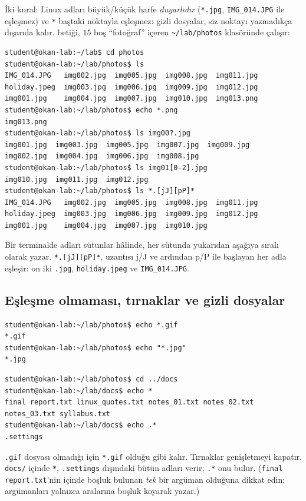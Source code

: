 İki kural: Linux adları büyük/küçük harfe \emph{duyarlıdır} (\texttt{*.jpg}, \texttt{IMG\_014.JPG} ile eşleşmez) ve \texttt{*} baştaki noktayla eşleşmez: gizli dosyalar, siz noktayı yazmadıkça dışarıda kalır.  betiği, $15$ boş ``fotoğraf'' içeren \texttt{\textasciitilde/lab/photos} klasöründe çalışır:

\begin{lstlisting}[style=term]
student@okan-lab:~/lab$ cd photos
student@okan-lab:~/lab/photos$ ls
IMG_014.JPG   img002.jpg  img005.jpg  img008.jpg  img011.jpg
holiday.jpeg  img003.jpg  img006.jpg  img009.jpg  img012.jpg
img001.jpg    img004.jpg  img007.jpg  img010.jpg  img013.png
student@okan-lab:~/lab/photos$ echo *.png
img013.png
student@okan-lab:~/lab/photos$ ls img00?.jpg
img001.jpg  img003.jpg  img005.jpg  img007.jpg  img009.jpg
img002.jpg  img004.jpg  img006.jpg  img008.jpg
student@okan-lab:~/lab/photos$ ls img01[0-2].jpg
img010.jpg  img011.jpg  img012.jpg
student@okan-lab:~/lab/photos$ ls *.[jJ][pP]*
IMG_014.JPG   img002.jpg  img005.jpg  img008.jpg  img011.jpg
holiday.jpeg  img003.jpg  img006.jpg  img009.jpg  img012.jpg
img001.jpg    img004.jpg  img007.jpg  img010.jpg
\end{lstlisting}

Bir terminalde  adları sütunlar hâlinde, her sütunda yukarıdan aşağıya sıralı olarak yazar. \texttt{*.[jJ][pP]*}, uzantısı j/J ve ardından p/P ile başlayan her adla eşleşir: on iki \texttt{.jpg}, \texttt{holiday.jpeg} ve \texttt{IMG\_014.JPG}.

\subsection{Eşleşme olmaması, tırnaklar ve gizli dosyalar}

\begin{lstlisting}[style=term]
student@okan-lab:~/lab/photos$ echo *.gif
*.gif
student@okan-lab:~/lab/photos$ echo "*.jpg"
*.jpg
\end{lstlisting}
\begin{lstlisting}[style=term]
student@okan-lab:~/lab/photos$ cd ../docs
student@okan-lab:~/lab/docs$ echo *
final report.txt linux_quotes.txt notes_01.txt notes_02.txt notes_03.txt syllabus.txt
student@okan-lab:~/lab/docs$ echo .*
.settings
\end{lstlisting}

\texttt{.gif} dosyası olmadığı için \texttt{*.gif} olduğu gibi kalır. Tırnaklar genişletmeyi kapatır. \texttt{docs/} içinde \texttt{*}, \texttt{.settings} dışındaki bütün adları verir; \texttt{.*} onu bulur. (\texttt{final report.txt}'nin içinde boşluk bulunan \emph{tek} bir argüman olduğuna dikkat edin;  argümanları yalnızca aralarına boşluk koyarak yazar.)

